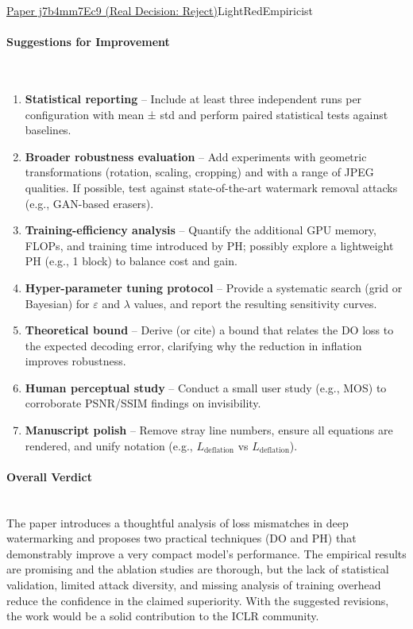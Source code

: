 \documentclass{article} %
\begin{document}
\begin{reviewbox}{\href{https://openreview.net/forum?id=j7b4mm7Ec9}{Paper j7b4mm7Ec9 (Real Decision: Reject)}}{LightRed}{Empiricist}
\paragraph{Suggestions for Improvement}
\leavevmode\\[0.1em]
\begin{enumerate}[leftmargin=0.5em, itemsep=0pt, topsep=0pt]
    \item \textbf{Statistical reporting} – Include at least three independent runs per configuration with mean ± std and perform paired statistical tests against baselines.  
    \item \textbf{Broader robustness evaluation} – Add experiments with geometric transformations (rotation, scaling, cropping) and with a range of JPEG qualities. If possible, test against state-of-the-art watermark removal attacks (e.g., GAN-based erasers).  
    \item \textbf{Training-efficiency analysis} – Quantify the additional GPU memory, FLOPs, and training time introduced by PH; possibly explore a lightweight PH (e.g., 1 block) to balance cost and gain.  
    \item \textbf{Hyper-parameter tuning protocol} – Provide a systematic search (grid or Bayesian) for $\varepsilon$ and $\lambda$ values, and report the resulting sensitivity curves.  
    \item \textbf{Theoretical bound} – Derive (or cite) a bound that relates the DO loss to the expected decoding error, clarifying why the reduction in inflation improves robustness.  
    \item \textbf{Human perceptual study} – Conduct a small user study (e.g., MOS) to corroborate PSNR/SSIM findings on invisibility.  
    \item \textbf{Manuscript polish} – Remove stray line numbers, ensure all equations are rendered, and unify notation (e.g., $L_{\text{deflation}}$ vs $L_\text{deflation}$).  
\end{enumerate}

\paragraph{Overall Verdict}
\leavevmode\\[0.1em]
The paper introduces a thoughtful analysis of loss mismatches in deep watermarking and proposes two practical techniques (DO and PH) that demonstrably improve a very compact model’s performance. The empirical results are promising and the ablation studies are thorough, but the lack of statistical validation, limited attack diversity, and missing analysis of training overhead reduce the confidence in the claimed superiority. With the suggested revisions, the work would be a solid contribution to the ICLR community.


\end{reviewbox}
\end{document}
